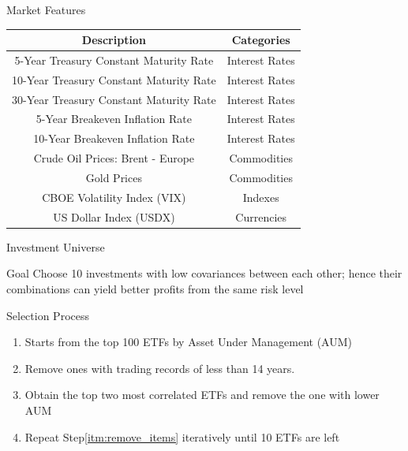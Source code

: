 \begin{frame}{Market Features}
\begin{tabular}{|| c| c||}
\hline
Description & Categories \\ \hline \hline
5-Year Treasury Constant Maturity Rate & Interest Rates\\ \hline
10-Year Treasury Constant Maturity Rate & Interest Rates\\ \hline
30-Year Treasury Constant Maturity Rate & Interest Rates\\ \hline
5-Year Breakeven Inflation Rate & Interest Rates\\ \hline
10-Year Breakeven Inflation Rate & Interest Rates\\ \hline
Crude Oil Prices: Brent - Europe &  Commodities\\ \hline
Gold Prices &  Commodities\\ \hline
CBOE Volatility Index (VIX) &  Indexes\\ \hline
US Dollar Index (USDX) &  Currencies\\ \hline
\end{tabular}
\end{frame}



\begin{frame}{Investment Universe}
\begin{block}{Goal}
Choose 10 investments with low covariances between each other; hence their combinations can yield better profits from the same risk level
\end{block}
\begin{block}{Selection Process}
    \begin{enumerate}
    \item Starts from the top 100 ETFs by Asset Under Management (AUM)
    \item Remove ones with trading records of less than 14 years.
    \item \label{itm:remove_items} Obtain the top two most correlated ETFs and remove the one with lower AUM
    \item Repeat Step\ref{itm:remove_items} iteratively until 10 ETFs are left
    \end{enumerate}
\end{block}
\end{frame}

